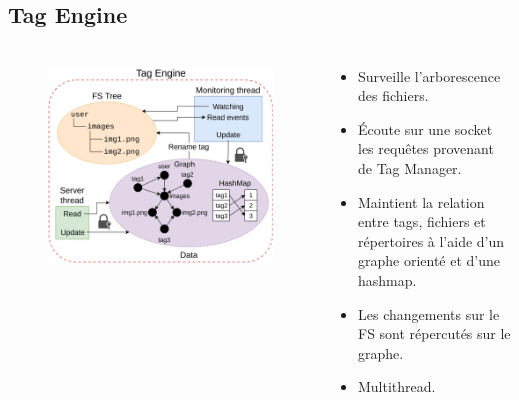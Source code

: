\documentclass[10pt]{beamer}
\begin{document}
\subsection{Tag Engine}
\begin{frame}
    \frametitle{\subsecname}
    \begin{columns}[T]
        \begin{column}{.5\textwidth}
            \begin{figure}
                \begin{center}
                    \includegraphics[width=1\textwidth]{images/tag_engine2.png}
                \end{center}
            \end{figure}
        \end{column}
        \pause
        \begin{column}{.5\textwidth}
            \begin{itemize}
                \item Surveille l'arborescence des fichiers.
                \item Écoute sur une socket les requêtes provenant de Tag Manager.
                \item Maintient la relation entre tags, fichiers et répertoires à l'aide d'un graphe orienté et d'une hashmap.
                \item Les changements sur le FS sont répercutés sur le graphe.
                \item Multithread.
            \end{itemize}
        \end{column}
    \end{columns}
\end{frame}
\end{document}

